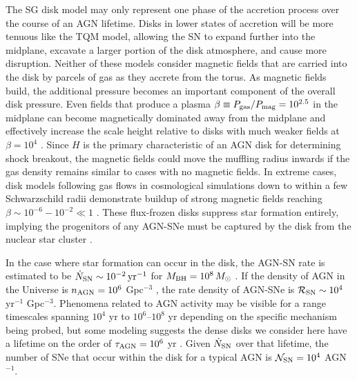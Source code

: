 The SG disk model may only represent one phase of the accretion process over the course of an AGN lifetime.
Disks in lower states of accretion will be more tenuous like the TQM model, allowing the SN to expand further into the midplane, excavate a larger portion of the disk atmosphere, and cause more disruption.
Neither of these models consider magnetic fields that are carried into the disk by parcels of gas as they accrete from the torus.
As magnetic fields build, the additional pressure becomes an important component of the overall disk pressure.
Even fields that produce a plasma $\beta \equiv P_{\rm gas} / P_{\rm mag} = 10^{2.5}$ in the midplane can become magnetically dominated away from the midplane and effectively increase the scale height relative to disks with much weaker fields at $\beta=10^4$ \citep{Gerling-Dunsmore+25}.
Since $H$ is the primary characteristic of an AGN disk for determining shock breakout, the magnetic fields could move the muffling radius inwards if the gas density remains similar to cases with no magnetic fields.
In extreme cases, disk models following gas flows in cosmological simulations down to within a few Schwarzschild radii demonstrate buildup of strong magnetic fields reaching $\beta \sim 10^{-6} - 10^{-2} \ll 1$ \citep{Hopkins+25}.
These flux-frozen disks suppress star formation entirely, implying the progenitors of any AGN-SNe must be captured by the disk from the nuclear star cluster \citep{Fabj+20,Nasim+22}.

In the case where star formation can occur in the disk, the AGN-SN rate is estimated to be $\dot{N}_{\rm SN}\sim10^{-2}\,{\rm yr}^{-1}$ for $M_{\rm BH}=10^8\,M_{\odot}$ \citep{HuangLinShields23}.
If the density of AGN in the Universe is $n_{\rm AGN}=10^6$ Gpc$^{-3}$ \citep{OsterbrockFerland06}, the rate density of AGN-SNe is $\mathcal{R_{\rm SN}} \sim 10^4$ yr$^{-1}$ Gpc$^{-3}$.
Phenomena related to AGN activity may be visible for a range timescales spanning $10^4$ yr \citep{Morganti17} to $10^6$--$10^8$ yr \citep{Biava+21} depending on the specific mechanism being probed, but some modeling suggests the dense disks we consider here have a lifetime on the order of $\tau_{\rm AGN}=10^6$ yr \citep{Angles-Alcazar+21}.
Given $\dot{N}_{\rm SN}$ over that lifetime, the number of SNe that occur within the disk for a typical AGN is $\mathcal{N}_{\rm SN}=10^4$ AGN$^{-1}$.

